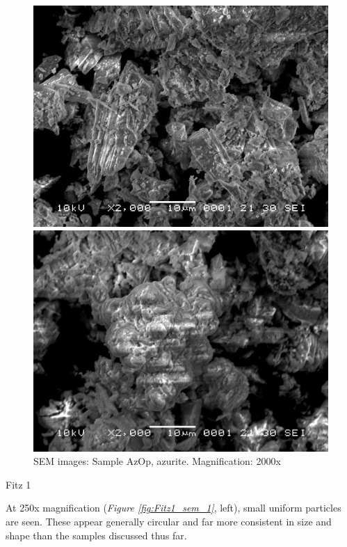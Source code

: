 \begin{figure}[H]
\centering
\begin{minipage}{.45\textwidth}
  \centering
  \includegraphics[width=\linewidth]{AzOp_x2000_1_150321}
\end{minipage}
\begin{minipage}{.45\textwidth}
  \centering
  \includegraphics[width=\linewidth]{AzOp_x2000_4_150321}
\end{minipage}
\caption[SEM images: Sample AzOp, azurite]{SEM images: Sample AzOp, azurite. Magnification: 2000x}
\label{fig:azop_sem_3}
\end{figure}


Fitz 1

At 250x magnification (\textit{Figure \ref{fig:Fitz1_sem_1}}, left), small uniform particles are seen. These appear generally circular and far more consistent in size and shape than the samples discussed thus far. 

